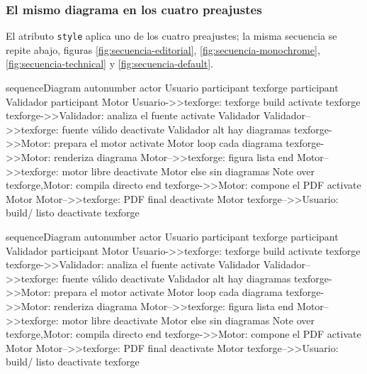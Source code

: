 \subsubsection{El mismo diagrama en los cuatro preajustes}

El atributo \texttt{style} aplica uno de los cuatro preajustes; la misma
secuencia se repite abajo, figuras \ref{fig:secuencia-editorial},
\ref{fig:secuencia-monochrome}, \ref{fig:secuencia-technical} y
\ref{fig:secuencia-default}.

\begin{mermaid}[style=editorial, width=0.62\linewidth, caption={\texttt{editorial}: paleta sobria con un solo acento}, label={fig:secuencia-editorial}, pos=t]
  sequenceDiagram
  autonumber
  actor Usuario
  participant texforge
  participant Validador
  participant Motor
  Usuario->>texforge: texforge build
  activate texforge
  texforge->>Validador: analiza el fuente
  activate Validador
  Validador-->>texforge: fuente válido
  deactivate Validador
  alt hay diagramas
  texforge->>Motor: prepara el motor
  activate Motor
  loop cada diagrama
  texforge->>Motor: renderiza diagrama
  Motor-->>texforge: figura lista
  end
  Motor-->>texforge: motor libre
  deactivate Motor
  else sin diagramas
  Note over texforge,Motor: compila directo
  end
  texforge->>Motor: compone el PDF
  activate Motor
  Motor-->>texforge: PDF final
  deactivate Motor
  texforge-->>Usuario: build/ listo
  deactivate texforge
\end{mermaid}

\begin{mermaid}[style=monochrome, width=0.62\linewidth, caption={\texttt{monochrome}: solo grises, para blanco y negro}, label={fig:secuencia-monochrome}, pos=t]
  sequenceDiagram
  autonumber
  actor Usuario
  participant texforge
  participant Validador
  participant Motor
  Usuario->>texforge: texforge build
  activate texforge
  texforge->>Validador: analiza el fuente
  activate Validador
  Validador-->>texforge: fuente válido
  deactivate Validador
  alt hay diagramas
  texforge->>Motor: prepara el motor
  activate Motor
  loop cada diagrama
  texforge->>Motor: renderiza diagrama
  Motor-->>texforge: figura lista
  end
  Motor-->>texforge: motor libre
  deactivate Motor
  else sin diagramas
  Note over texforge,Motor: compila directo
  end
  texforge->>Motor: compone el PDF
  activate Motor
  Motor-->>texforge: PDF final
  deactivate Motor
  texforge-->>Usuario: build/ listo
  deactivate texforge
\end{mermaid}

